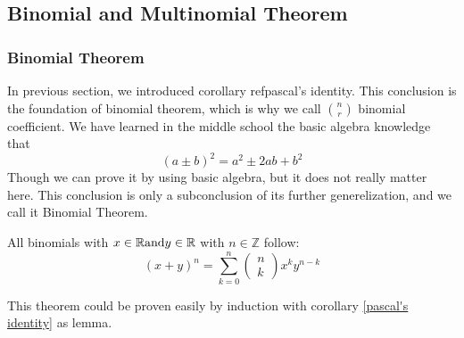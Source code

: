         \subsection{Binomial and Multinomial Theorem}
        \subsubsection*{Binomial Theorem}
        In previous section, we introduced corollary ref{pascal's identity}. This conclusion is the foundation
        of binomial theorem, which is why we call $\binom{n}{r}$ binomial coefficient. We have learned in the
        middle school the basic algebra knowledge that 
        \begin{equation}
            (a\pm b)^2 = a^2 \pm 2ab + b^2 
        \end{equation}
        Though we can prove it by using basic algebra, but it does not really matter here. This conclusion
        is only a subconclusion of its further generelization, and we call it Binomial Theorem.
        \begin{theorem}\label{BT}
            All binomials with $x\in \mathbb{R}\space \text{and}\space y\in \mathbb{R}$ with $n \in 
            \mathbb{Z}$ follow: $$(x+y)^{n}=\sum_{k=0}^{n}\left(\begin{array}{l}n \\k\end{array}\right) x^{k} y^{n-k}$$
        \end{theorem}
        This theorem could be proven easily by induction with corollary \ref{pascal's identity} as lemma.
